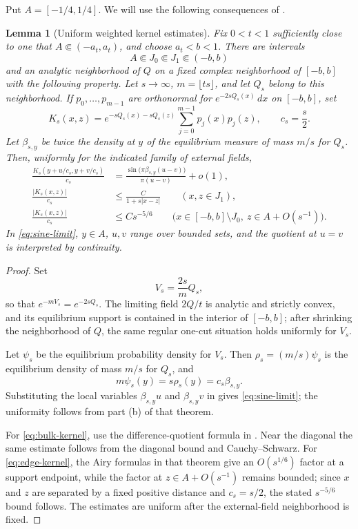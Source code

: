 \documentclass[11pt]{article}
\newtheorem{lemma}[theorem]{Lemma}
\theoremstyle{definition}
\numberwithin{equation}{section}
\begin{document}
Put \(A=[-1/4,1/4]\). We will use the following consequences of
\cite{KSSV}.

\begin{lemma}[Uniform weighted kernel estimates]\label{lem:kssv-kernel}
Fix \(0<t<1\) sufficiently close to one that \(A\Subset(-a_t,a_t)\),
and choose \(a_t<b<1\). There are intervals
\[
 A\Subset J_0\Subset J_1\Subset(-b,b)
\]
and an analytic neighborhood of \(Q\) on a fixed complex neighborhood
of \([-b,b]\) with the following property.
Let \(s\to\infty\), \(m=\lfloor ts\rfloor\), and let \(Q_s\) belong
to this neighborhood. If \(p_0,\ldots,p_{m-1}\) are orthonormal for
\(e^{-2sQ_s(x)}\,dx\) on \([-b,b]\), set
\begin{equation}\label{eq:kernel}
 K_s(x,z)=e^{-sQ_s(x)-sQ_s(z)}
 \sum_{j=0}^{m-1}p_j(x)p_j(z),
 \qquad c_s=\frac{s}{2}.
\end{equation}
Let \(\beta_{s,y}\) be twice the density at \(y\) of the equilibrium
measure of mass \(m/s\) for \(Q_s\). Then, uniformly for the indicated
family of external fields,
\begin{align}
 \frac{K_s(y+u/c_s,y+v/c_s)}{c_s}
 &=\frac{\sin\bigl(\pi\beta_{s,y}(u-v)\bigr)}{\pi(u-v)}+o(1),
 \label{eq:sine-limit}\\
 \frac{|K_s(x,z)|}{c_s}
 &\le \frac{C}{1+s|x-z|}
 \qquad (x,z\in J_1), \label{eq:bulk-kernel}\\
 \frac{|K_s(x,z)|}{c_s}
 &\le Cs^{-5/6}
 \qquad\bigl(x\in[-b,b]\setminus J_0,\
 z\in A+O(s^{-1})\bigr). \label{eq:edge-kernel}
\end{align}
In \eqref{eq:sine-limit}, \(y\in A\), \(u,v\) range over bounded
sets, and the quotient at \(u=v\) is interpreted by continuity.
\end{lemma}

\begin{proof}
Set
\[
 V_s=\frac{2s}{m}Q_s,
\]
so that \(e^{-mV_s}=e^{-2sQ_s}\). The limiting field \(2Q/t\) is
analytic and strictly convex, and its equilibrium support is contained
in the interior of \([-b,b]\); after shrinking the neighborhood of
\(Q\), the same regular one-cut situation holds uniformly for \(V_s\).

Let \(\psi_s\) be the equilibrium probability density for \(V_s\).
Then \(\rho_s=(m/s)\psi_s\) is the equilibrium density of mass \(m/s\)
for \(Q_s\), and
\[
 m\psi_s(y)=s\rho_s(y)=c_s\beta_{s,y}.
\]
Substituting the local variables \(\beta_{s,y}u\) and
\(\beta_{s,y}v\) in \cite[Theorem 1.8 (bulk universality)]{KSSV}
gives \eqref{eq:sine-limit}; the uniformity follows from part (b) of
that theorem.

For \eqref{eq:bulk-kernel}, use the difference-quotient formula in
\cite[Theorem 1.3]{KSSV}. Near the diagonal the same estimate follows
from the diagonal bound and Cauchy--Schwarz. For
\eqref{eq:edge-kernel}, the Airy formulas in that theorem give an
\(O(s^{1/6})\) factor at a support endpoint, while the factor at
\(z\in A+O(s^{-1})\) remains bounded; since \(x\) and \(z\) are
separated by a fixed positive distance and \(c_s=s/2\), the stated
\(s^{-5/6}\) bound follows. The estimates are uniform after the
external-field neighborhood is fixed.
\end{proof}
\end{document}
